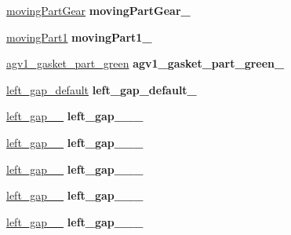 \begin{DoxyCompactItemize}
\item 
\mbox{\label{classGantryControl_a620f4e5154a16247e8bfd40f3dc96cc9}} 
\hyperlink{structPresetLocation}{moving\+Part\+Gear} {\bfseries moving\+Part\+Gear\+\_\+}
\item 
\mbox{\label{classGantryControl_adc812c7637f4f5197e148d218863dd31}} 
\hyperlink{structPresetLocation}{moving\+Part1} {\bfseries moving\+Part1\+\_\+}
\item 
\mbox{\label{classGantryControl_ae2fe36e62c24120098f0df9b0a16b6cf}} 
\hyperlink{structPresetLocation}{agv1\+\_\+gasket\+\_\+part\+\_\+green} {\bfseries agv1\+\_\+gasket\+\_\+part\+\_\+green\+\_\+}
\item 
\mbox{\label{classGantryControl_aa7deacc1eae5a75703c3a5f9353adfad}} 
\hyperlink{structPresetLocation}{left\+\_\+gap\+\_\+default} {\bfseries left\+\_\+gap\+\_\+default\+\_\+}
\item 
\mbox{\label{classGantryControl_a374a6941b461ba7d7d8a504a0a7eb9e6}} 
\hyperlink{structPresetLocation}{left\+\_\+gap\+\_\+\_} {\bfseries left\+\_\+gap\+\_\+\_\+\_\+}
\item 
\mbox{\label{classGantryControl_a7dca2dd2df04ecb5cb2265124ad574fc}} 
\hyperlink{structPresetLocation}{left\+\_\+gap\+\_\+\_} {\bfseries left\+\_\+gap\+\_\+\_\+\_\+}
\item 
\mbox{\label{classGantryControl_afe69d5b7448a3dbbae8cb3926b305d92}} 
\hyperlink{structPresetLocation}{left\+\_\+gap\+\_\+\_} {\bfseries left\+\_\+gap\+\_\+\_\+\_\+}
\item 
\mbox{\label{classGantryControl_a6ad2d7c47467f3c9961680f1890c4298}} 
\hyperlink{structPresetLocation}{left\+\_\+gap\+\_\+\_} {\bfseries left\+\_\+gap\+\_\+\_\+\_\+}
\item 
\mbox{\label{classGantryControl_aba604547b6a4e2b02158f548ebb6871b}} 
\hyperlink{structPresetLocation}{left\+\_\+gap\+\_\+\_} {\bfseries left\+\_\+gap\+\_\+\_\+\_\+}
\item 

\end{DoxyCompactItemize}
